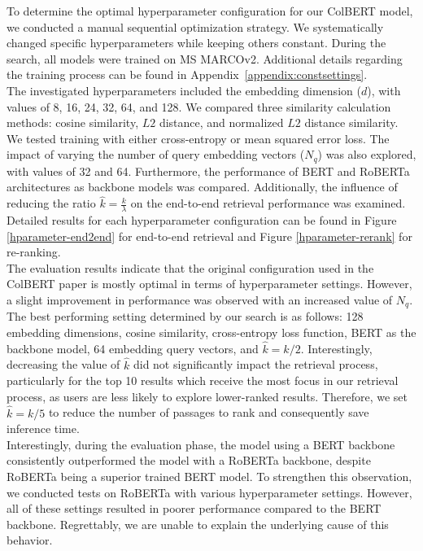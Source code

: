 \documentclass[11pt]{article}
\begin{document}
To determine the optimal hyperparameter configuration for our ColBERT model, we conducted a manual sequential optimization strategy. We systematically changed specific hyperparameters while keeping others constant. During the search, all models  were trained on MS MARCOv2. Additional details regarding the training process can be found in Appendix~\ref{appendix:constsettings}. \\
The investigated hyperparameters included the embedding dimension ($d$), with values of 8, 16, 24, 32, 64, and 128. We compared three similarity calculation methods: cosine similarity, $L2$ distance, and normalized $L2$ distance similarity. We tested training with either cross-entropy or mean squared error loss. The impact of varying the number of query embedding vectors ($N_q$) was also explored, with values of 32 and 64. Furthermore, the performance of BERT and RoBERTa architectures as backbone models was compared. Additionally, the influence of reducing the ratio $\hat{k} = \frac{k}{\lambda}$ on the end-to-end retrieval performance was examined. Detailed results for each hyperparameter configuration can be found in Figure \ref{hparameter-end2end} for end-to-end retrieval and Figure \ref{hparameter-rerank} for re-ranking.\\
The evaluation results indicate that the original configuration used in the ColBERT paper is mostly optimal in terms of hyperparameter settings. However, a slight improvement in performance was observed with an increased value of $N_q$. The best performing setting determined by our search is as follows: 128 embedding dimensions, cosine similarity, cross-entropy loss function, BERT as the backbone model, 64 embedding query vectors, and $\hat{k} = k / 2$. Interestingly, decreasing the value of $\hat{k}$ did not significantly impact the retrieval process, particularly for the top 10 results which receive the most focus in our retrieval process, as users are less likely to explore lower-ranked results. Therefore, we set $\hat{k} = k / 5$ to reduce the number of passages to rank and consequently save inference time. \\
Interestingly, during the evaluation phase, the model using a BERT backbone consistently outperformed the model with a RoBERTa backbone, despite RoBERTa being a superior trained BERT model. To strengthen this observation, we conducted tests on RoBERTa with various hyperparameter settings. However, all of these settings resulted in poorer performance compared to the BERT backbone. Regrettably, we are unable to explain the underlying cause of this behavior.
\end{document}
